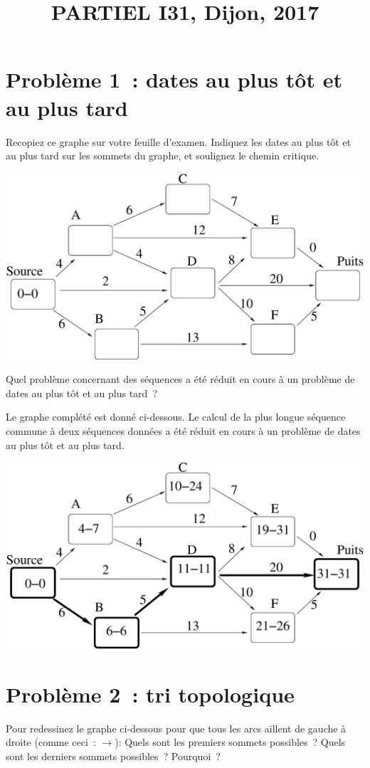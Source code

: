 \documentclass[11pt]{article}
\begin{document}
\title{\vspace{-2.5cm}PARTIEL I31, Dijon, 2017}
\date{}\maketitle

\section{Problème 1~: dates au plus tôt et au plus tard}

Recopiez ce graphe sur votre feuille d'examen. Indiquez les dates au plus tôt et au plus tard sur les sommets du graphe, 
et soulignez le chemin critique. 

\begin{center}
\includegraphics[width=0.7\linewidth]{critique2.eps}
\end{center}

Quel problème concernant des séquences a été réduit en cours à un problème de
dates au plus tôt et au plus tard~?

Le graphe complété est donné ci-dessous. Le calcul de la plus longue séquence commune à deux séquences données a été réduit en cours à un problème de dates au plus tôt et au plus tard.

\begin{center}
\includegraphics[width=0.75\linewidth]{critique2_solution.eps}
\end{center}


\section{Problème 2~: tri topologique}
Pour redessinez le graphe ci-dessous pour que tous les arcs aillent de gauche à droite (comme ceci~: $\rightarrow$):
Quels sont les premiers sommets possibles~?
Quels sont les derniers sommets possibles~? Pourquoi~?
\end{document}
